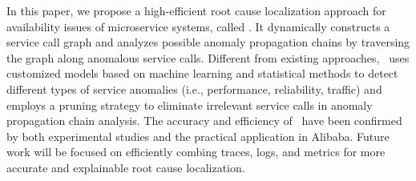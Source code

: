 In this paper, we propose a high-efficient root cause localization approach for availability issues of microservice systems, called \app.
It dynamically constructs a service call graph and analyzes possible anomaly propagation chains by traversing the graph along anomalous service calls.
Different from existing approaches, \app~uses customized models based on machine learning and statistical methods to detect different types of service anomalies (i.e., performance, reliability, traffic) and employs a pruning strategy to eliminate irrelevant service calls in anomaly propagation chain analysis.
The accuracy and efficiency of \app~have been confirmed by both experimental studies and the practical application in Alibaba.
Future work will be focused on efficiently combing traces, logs, and metrics for more accurate and explainable root cause localization.